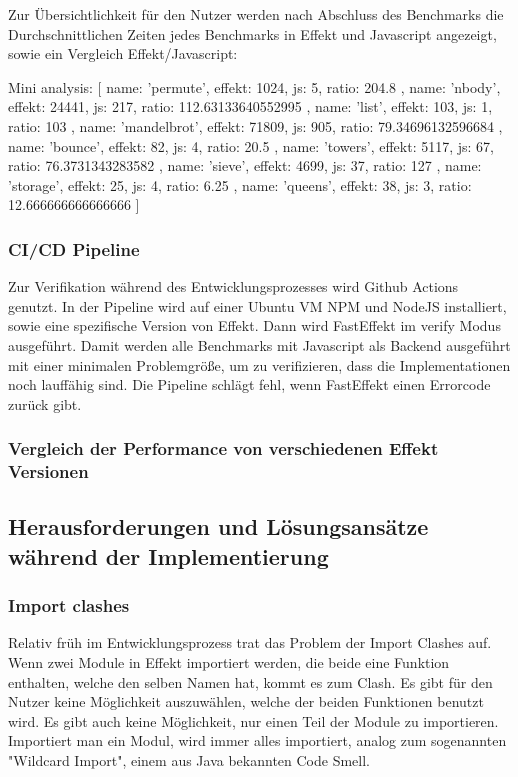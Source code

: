 Zur Übersichtlichkeit für den Nutzer werden nach Abschluss des Benchmarks die Durchschnittlichen Zeiten jedes Benchmarks in Effekt und Javascript angezeigt, sowie ein Vergleich Effekt/Javascript:

Mini analysis: [
{ name: 'permute', effekt: 1024, js: 5, ratio: 204.8 },
{ name: 'nbody', effekt: 24441, js: 217, ratio: 112.63133640552995 },
{ name: 'list', effekt: 103, js: 1, ratio: 103 },
{
name: 'mandelbrot',
effekt: 71809,
js: 905,
ratio: 79.34696132596684
},
{ name: 'bounce', effekt: 82, js: 4, ratio: 20.5 },
{ name: 'towers', effekt: 5117, js: 67, ratio: 76.3731343283582 },
{ name: 'sieve', effekt: 4699, js: 37, ratio: 127 },
{ name: 'storage', effekt: 25, js: 4, ratio: 6.25 },
{ name: 'queens', effekt: 38, js: 3, ratio: 12.666666666666666 }
] 


\subsubsection{ CI/CD Pipeline }

Zur Verifikation während des Entwicklungsprozesses wird Github Actions genutzt. In der Pipeline wird auf einer Ubuntu VM 
NPM und NodeJS installiert, sowie eine spezifische Version von Effekt. Dann wird FastEffekt im verify Modus ausgeführt. 
Damit werden alle Benchmarks mit Javascript als Backend ausgeführt mit einer minimalen Problemgröße, um zu verifizieren, dass die Implementationen noch lauffähig sind.
Die Pipeline schlägt fehl, wenn FastEffekt einen Errorcode zurück gibt.

\subsubsection{ Vergleich der Performance von verschiedenen Effekt Versionen }
 

\subsection{ Herausforderungen und Lösungsansätze während der Implementierung }

\subsubsection{ Import clashes }
Relativ früh im Entwicklungsprozess trat das Problem der Import Clashes auf. Wenn zwei Module in Effekt importiert werden,
die beide eine Funktion enthalten, welche den selben Namen hat, kommt es zum Clash. Es gibt für den Nutzer keine Möglichkeit 
auszuwählen, welche der beiden Funktionen benutzt wird. Es gibt auch keine Möglichkeit, nur einen Teil der Module zu importieren.
Importiert man ein Modul, wird immer alles importiert, analog zum sogenannten "Wildcard Import", einem aus Java bekannten Code Smell.

